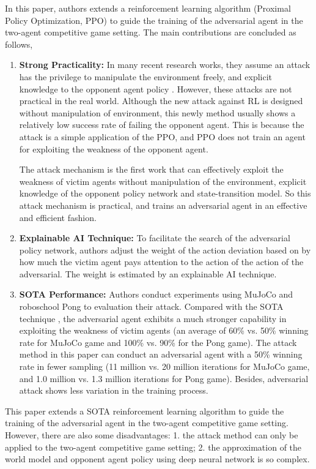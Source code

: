 \documentclass[a4paper]{article}
\begin{document}
In this paper, authors extends a reinforcement learning algorithm (Proximal Policy Optimization, PPO) to guide the training of the adversarial agent in the two-agent competitive game setting.
The main contributions are concluded as follows,
\begin{enumerate}
    \item \textbf{Strong Practicality:} In many recent research works, they assume an attack has the privilege to manipulate the environment freely, and explicit knowledge to the opponent agent policy \cite{xiao2019characterizing}. 
    However, these attacks are not practical in the real world. Although the new attack against RL is designed without manipulation of environment\cite{vinyals2019grandmaster}, 
    this newly method usually shows a relatively low success rate of failing the opponent agent. This is because the attack is a simple application of the PPO, and PPO does not train an agent for exploiting the weakness of the opponent agent.
    
    The attack mechanism is the first work that can effectively exploit the weakness of victim agents without manipulation of the environment, explicit knowledge of the opponent policy network and state-transition model.
    So this attack mechanism is practical, and trains an adversarial agent in an effective and efficient fashion. 
    \item \textbf{Explainable AI Technique:} To facilitate the search of the adversarial policy network, 
    authors adjust the weight of the action deviation based on by how much the victim agent pays attention to the action of the action of the adversarial.
    The weight is estimated by an explainable AI technique.
    \item \textbf{SOTA Performance:} Authors conduct experiments using MuJoCo and roboschool Pong to evaluation their attack. Compared with the SOTA technique \cite{gleave2019adversarial},
    the adversarial agent exhibits a much stronger capability in exploiting the weakness of victim agents (an average of 60\% vs. 50\% winning rate for
    MuJoCo game and 100\% vs. 90\% for the Pong game). The attack method in this paper can conduct an adversarial agent with a 50\% winning rate in fewer sampling (11 million vs. 20
    million iterations for MuJoCo game, and 1.0 million vs. 1.3 million iterations for Pong game).
    Besides, adversarial attack shows less variation in the training process.
\end{enumerate}

This paper extends a SOTA reinforcement learning algorithm to guide the training of the adversarial agent in the two-agent competitive game setting. However, there are also some disadvantages: 
1. the attack method can only be applied to the two-agent competitive game setting; 
2. the approximation of the world model and opponent agent policy using deep neural network is so complex. 
\end{document}
